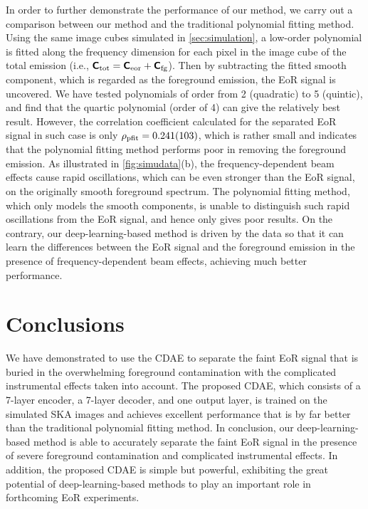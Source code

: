 \documentclass[letters,a4paper,fleqn,usenatbib]{mnras}
\newcommand{\R}[1]{\mathrm{#1}}
\newcommand{\M}[1]{\mathbfss{#1}}
\begin{document}
In order to further demonstrate the performance of our method, we carry
out a comparison between our method and the traditional polynomial
fitting method.
Using the same image cubes simulated in \autoref{sec:simulation},
a low-order polynomial is fitted along the frequency dimension for each
pixel in the image cube of the total emission (i.e.,
$\M{C}_{\R{tot}} = \M{C}_{\R{eor}} + \M{C}_{\R{fg}}$).
Then by subtracting the fitted smooth component, which is regarded as
the foreground emission, the EoR signal is uncovered.
We have tested polynomials of order from 2 (quadratic) to 5 (quintic),
and find that the quartic polynomial (order of 4) can give the
relatively best result.
However, the correlation coefficient calculated for the separated EoR
signal in such case is only $\rho_{\R{pfit}} = \num{0.241 +- 0.103}$,
which is rather small and indicates that the polynomial fitting method
performs poor in removing the foreground emission.
As illustrated in \autoref{fig:simudata}(b), the frequency-dependent
beam effects cause rapid oscillations, which can be even stronger than
the EoR signal, on the originally smooth foreground spectrum.
The polynomial fitting method, which only models the smooth components,
is unable to distinguish such rapid oscillations from the EoR signal,
and hence only gives poor results.
On the contrary, our deep-learning-based method is driven by the data
so that it can learn the differences between the EoR signal and the
foreground emission in the presence of frequency-dependent beam effects,
achieving much better performance.


\section{Conclusions}
\label{sec:conclusions}

We have demonstrated to use the CDAE to separate the faint EoR signal
that is buried in the overwhelming foreground contamination with the
complicated instrumental effects taken into account.
The proposed CDAE, which consists of a 7-layer encoder, a 7-layer
decoder, and one output layer, is trained on the simulated SKA images
and achieves excellent performance that is by far better than the
traditional polynomial fitting method.
In conclusion, our deep-learning-based method is able to accurately
separate the faint EoR signal in the presence of severe foreground
contamination and complicated instrumental effects.
In addition, the proposed CDAE is simple but powerful, exhibiting the
great potential of deep-learning-based methods to play an important
role in forthcoming EoR experiments.
\end{document}
